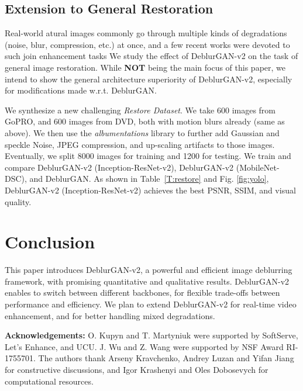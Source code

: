 \documentclass[10pt,twocolumn,letterpaper]{article}
\begin{document}
\subsection{Extension to General Restoration}
\vspace{-0.4em}
Real-world atural images commonly go through multiple kinds of degradations (noise, blur, compression, etc.) at once, and a few recent works were devoted to such join enhancement tasks \cite{lsd2,gated}
We study the effect of DeblurGAN-v2 on the task of general image restoration. While \textbf{NOT} being the main focus of this paper, we intend to show the general architecture superiority of DeblurGAN-v2, especially for modifications made w.r.t. DeblurGAN. 

We synthesize a new challenging \textit{Restore Dataset}. We take 600 images from GoPRO, and 600 images from DVD, both with motion blurs already (same as above). We then use the \textit{albumentations} library \cite{2018arXiv180906839B} to further add Gaussian and speckle Noise, JPEG compression, and up-scaling artifacts to those images. Eventually, we split 8000 images for training and 1200 for testing. We train and compare DeblurGAN-v2 (Inception-ResNet-v2), DeblurGAN-v2 (MobileNet-DSC), and DeblurGAN. As shown in Table~\ref{T:restore} and Fig. \ref{fig:yolo}, 
DeblurGAN-v2 (Inception-ResNet-v2) achieves the best PSNR, SSIM, and visual quality. 









\vspace{-0.5em}
\section{Conclusion}
\vspace{-0.5em}
This paper introduces DeblurGAN-v2, a powerful and efficient image deblurring framework, with promising quantitative and qualitative results. DeblurGAN-v2 enables to switch between different backbones, for flexible trade-offs between performance and efficiency. We plan to extend DeblurGAN-v2 for real-time video enhancement, and for better handling mixed degradations.

\textbf{Acknowledgements:}
O. Kupyn and T. Martyniuk were supported by SoftServe, Let's Enhance, and UCU. J. Wu and Z. Wang were supported by NSF Award RI-1755701. The authors thank Arseny Kravchenko, Andrey Luzan and Yifan Jiang for constructive discussions, and Igor Krashenyi and Oles Dobosevych for computational resources.



	


{\small


}
\end{document}
